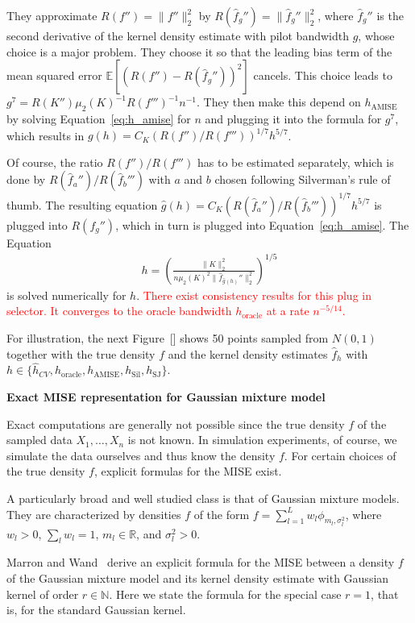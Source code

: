 They approximate $R(f'')=\|f''\|_2^2$ by $R(\hat{f}_g'')=\|\hat{f}_g''\|_2^2$, where $\hat{f}_g''$ is the second derivative of the kernel density estimate with pilot bandwidth $g$, whose choice is a major problem. They choose it so that the leading bias term of the mean squared error $\mathbb{E}[(R(f'')-R(\hat{f}_g''))^2]$ cancels. This choice leads to $g^7=R(K'')\mu_2(K)^{-1}R(f''')^{-1}n^{-1}$. They then make this depend on $h_{\operatorname{AMISE}}$ by solving Equation~\eqref{eq:h_amise} for $n$ and plugging it into the formula for $g^7$, which results in $g(h)=C_K(R(f'')/R(f'''))^{1/7}h^{5/7}$.

Of course, the ratio $R(f'')/R(f''')$ has to be estimated separately, which is done by $R(\hat{f}_a'')/R(\hat{f}_b''')$ with $a$ and $b$ chosen following Silverman's rule of thumb. The resulting equation $\hat{g}(h)=C_K(R(\hat{f}_a'')/R(\hat{f}_b'''))^{1/7}h^{5/7}$ is plugged into $R(f_g'')$, which in turn is plugged into Equation~\eqref{eq:h_amise}. The Equation
\begin{align*}
    h=\left(\frac{\|K\|_2^2}{n\mu_2(K)^2\|\hat{f}_{\hat{g}(h)}''\|_2^2}\right)^{1/5}
\end{align*}
is solved numerically for $h$. \textcolor{red}{There exist consistency results for this plug in selector. It converges to the oracle bandwidth $h_{\text{oracle}}$ at a rate $n^{-5/14}$.}

For illustration, the next Figure~[] shows 50 points sampled from $N(0,1)$ together with the true density $f$ and the kernel density estimates $\hat{f}_{h}$ with $h\in\{\hat{h}_{CV},h_{\text{oracle}},h_{\text{AMISE}},h_{\text{Sil}},h_{\text{SJ}}\}$.

\textbf{Exact MISE representation for Gaussian mixture model}

Exact computations are generally not possible since the true density $f$ of the sampled data $X_1,\dots,X_n$ is not known. In simulation experiments, of course, we simulate the data ourselves and thus know the density $f$. For certain choices of the true density $f$, explicit formulas for the MISE exist.


A particularly broad and well studied class is that of Gaussian mixture models. They are characterized by densities $f$ of the form $f=\sum_{l=1}^{L}w_l\phi_{m_l,\sigma_l^2}$, where $w_l>0$, $\sum_lw_l=1$, $m_l\in\mathbb{R}$, and $\sigma_l^2>0$.

Marron and Wand~\cite{10.1214/aos/1176348653} derive an explicit formula for the MISE between a density $f$ of the Gaussian mixture model and its kernel density estimate with Gaussian kernel of order $r\in\mathbb{N}$. Here we state the formula for the special case $r=1$, that is, for the standard Gaussian kernel.

